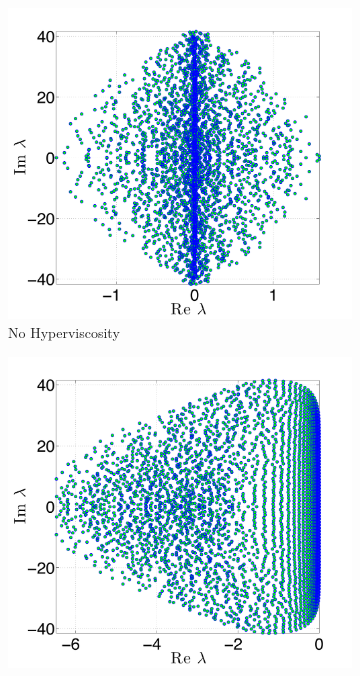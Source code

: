 \documentclass{report}
\begin{document}
\begin{figure}[ht!]
\begin{center}
\begin{subfigure}[b]{0.45\textwidth}
	\centering
	\includegraphics[width=1.0\textwidth]{../figures/paper1/cosine_bell/eigs_N4096_n101_noHV_SCALED_color.pdf}
	\caption{No Hyperviscosity}
	\label{fig:cosine_eigs_nohv}
\end{subfigure}
\begin{subfigure}[b]{0.45\textwidth}
	\includegraphics[width=1.0\textwidth]{../figures/paper1/cosine_bell/eigs_HV_N4096_n101_k8_gamma5e_m2_SCALED_color.pdf}

\end{subfigure}
\end{center}
\end{figure}
\end{document}
